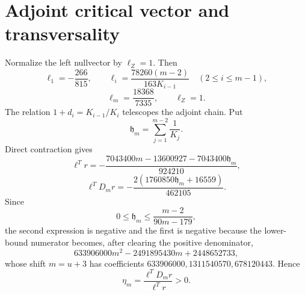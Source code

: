 \section*{Adjoint critical vector and transversality}
Normalize the left nullvector by $\ell_Z=1$.  Then
\[
\ell_1=-\frac{266}{815},
\qquad
\ell_i=\frac{78260(m-2)}{163K_{i-1}}
\quad(2\le i\le m-1),
\]
\[
\ell_m=\frac{18368}{7335},
\qquad
\ell_Z=1.
\]
The relation $1+d_i=K_{i-1}/K_i$ telescopes the adjoint chain.  Put
\[
\mathfrak h_m=\sum_{j=1}^{m-2}\frac1{K_j}.
\]
Direct contraction gives
\[
\ell^Tr=-\frac{7043400m-13600927-7043400\mathfrak h_m}{924210},
\]
\[
\ell^TD_mr=-\frac{2(1760850\mathfrak h_m+16559)}{462105}.
\]
Since
\[
0\le \mathfrak h_m\le\frac{m-2}{90m-179},
\]
the second expression is negative and the first is negative because the
lower-bound numerator becomes, after clearing the positive denominator,
\[
633906000m^2-2491895430m+2448652733,
\]
whose shift $m=u+3$ has coefficients
$633906000,1311540570,678120443$.  Hence
\[
\eta_m=\frac{\ell^TD_mr}{\ell^Tr}>0.
\]
